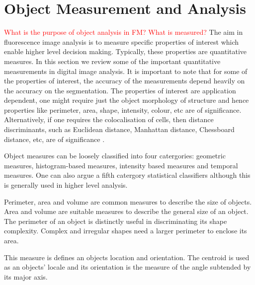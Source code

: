 
\section{Object Measurement and Analysis}
\label{sec:Measurements}

\textcolor{red}{What is the purpose of object analysis in FM? What is measured?}
The aim in fluorescence image analysis is to measure specific properties of interest which enable higher level decision making.
Typically, these properties are quantitative measures.
In this section we review some of the important quantitative measurements in digital image analysis.
It is important to note that for some of the properties of interest, the accuracy of the measurements depend heavily on the accuracy on the segmentation.
The properties of interest are application dependent, one might require just the object morphology of structure and hence properties like perimeter, area, shape, intensity, colour, etc are of significance.
Alternatively, if one requires the colocalisation of cells, then distance discriminants, such as Euclidean distance, Manhattan distance, Chessboard distance, etc, are of significance \citep{Fatima2008_2,Danek2012}.

Object measures can be loosely classified into four catergories: geometric measures, histogram-based measures, intensity based measures and temporal measures. One can also argue a fifth catergory statistical classifiers although this is generally used in higher level analysis.

\begin{definition}
	Perimeter, area and volume are common measures to describe the size of objects.
	Area and volume are suitable measures to describe the general size of an object.
	The perimeter of an object is distinctly useful in discriminating its shape complexity. Complex and irregular shapes need a larger perimeter to enclose its area.
\end{definition}

\begin{definition}
	This measure is defines an objects location and orientation.
	The centroid is used as an objects' locale and its orientation is the measure of the angle subtended by its major axis.
\end{definition}

